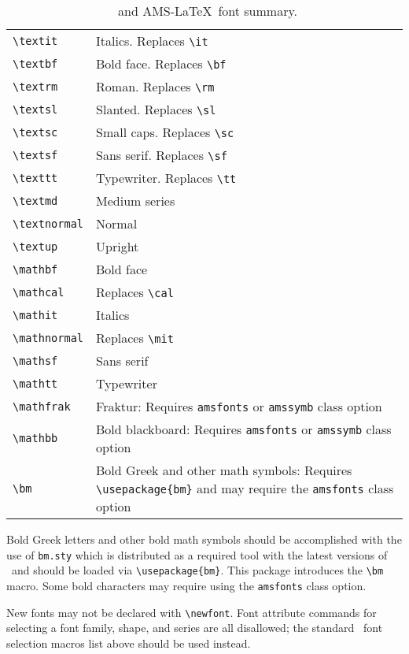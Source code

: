 \documentclass[twocolumn,secnumarabic,amssymb, nobibnotes, aps, prd]{revtex4-2}
\newcommand{\classoption}[1]{\texttt{#1}}
\newcommand{\macro}[1]{\texttt{\textbackslash#1}}
\newcommand{\m}[1]{\macro{#1}}
\begin{document}
\begin{table}
\caption{\label{tab:fonts}\LaTeXe\ and AMS-\LaTeX\ font summary.}
\begin{ruledtabular}
\begin{tabular}{lp{2in}}
\m{textit} & Italics. Replaces \m{it}\\
\m{textbf} & Bold face. Replaces \m{bf}\\
\m{textrm} & Roman. Replaces \m{rm}\\
\m{textsl} & Slanted. Replaces \m{sl}\\
\m{textsc} & Small caps. Replaces \m{sc}\\
\m{textsf} & Sans serif. Replaces \m{sf}\\
\m{texttt} & Typewriter. Replaces \m{tt}\\
\m{textmd} & Medium series\\
\m{textnormal} & Normal\\
\m{textup} & Upright\\
\m{mathbf} & Bold face\\
\m{mathcal} & Replaces \m{cal}\\
\m{mathit} & Italics\\
\m{mathnormal} & Replaces \m{mit}\\
\m{mathsf} & Sans serif\\
\m{mathtt} & Typewriter\\
\m{mathfrak} & Fraktur: Requires \classoption{amsfonts} or \classoption{amssymb} class option\\
\m{mathbb} & Bold blackboard: Requires \classoption{amsfonts} or \classoption{amssymb} class option\\
\m{bm} & Bold Greek and other math symbols: Requires
\verb+\usepackage{bm}+ and may require the \classoption{amsfonts} class
option
\end{tabular}
\end{ruledtabular}
\end{table}

Bold Greek letters and other bold math symbols should be accomplished
with the use of \texttt{bm.sty} which is distributed as a required
tool with the latest versions of \LaTeXe\ and should be loaded via
\verb+\usepackage{bm}+. This package introduces the \m{bm}
macro. Some bold characters may require using the
\classoption{amsfonts} class option.

New fonts may not be declared with \m{newfont}. Font attribute
commands for selecting a font family, shape, and series are all
disallowed; the standard \LaTeXe\ font selection macros list above
should be used instead.
\end{document}
